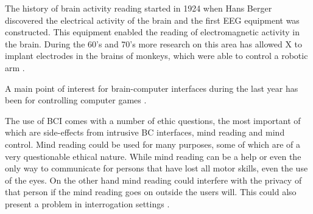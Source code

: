 The history of brain activity reading started in 1924 when Hans Berger discovered the electrical activity of the brain and the first EEG equipment was constructed. This equipment enabled the reading of electromagnetic activity in the brain. During the 60's and 70's more research on this area has allowed  X to implant electrodes in the brains of monkeys, which were able to control a robotic arm .


A main point of interest for brain-computer interfaces during the last year has been for controlling computer games .


The use of BCI comes with a number of ethic questions, the most important of which are side-effects from intrusive BC interfaces, mind reading and mind control.
Mind reading could be used for many purposes, some of which are of a very questionable ethical nature. While mind reading can be a help or even the only way to communicate for persons that have lost all motor skills, even the use of the eyes. On the other hand mind reading could interfere with the privacy of that person if the mind reading goes on outside the users will. This could also present a problem in interrogation settings .

